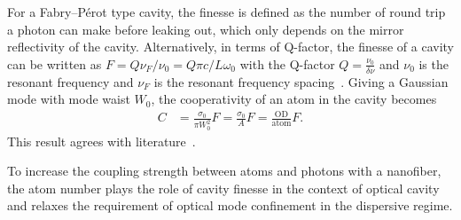 For a Fabry–Pérot type cavity, the finesse is defined as the number of round trip a photon can make before leaking out, which only depends on the mirror reflectivity of the cavity. 
Alternatively, in terms of Q-factor, the finesse of a cavity can be written as $ F= Q\nu_F/\nu_0= Q \pi c/L\omega_0 $ with the Q-factor $ Q=\frac{\nu_0}{\delta\nu} $ and $ \nu_0 $ is the resonant frequency and $ \nu_F $ is the resonant frequency spacing~\cite{Saleh2007}. 
Giving a Gaussian mode with mode waist $ W_0 $, the cooperativity of an atom in the cavity becomes
\begin{align}
C &= \frac{\sigma_0}{\pi W_0^2} F = \frac{\sigma_0}{A} F = \frac{\mathrm{OD}}{\mathrm{atom}} F.
\end{align}
This result agrees with literature~\cite{Hunger2010}. 

To increase the coupling strength between atoms and photons with a nanofiber, the atom number plays the role of cavity finesse in the context of optical cavity and relaxes the requirement of optical mode confinement in the dispersive regime. 